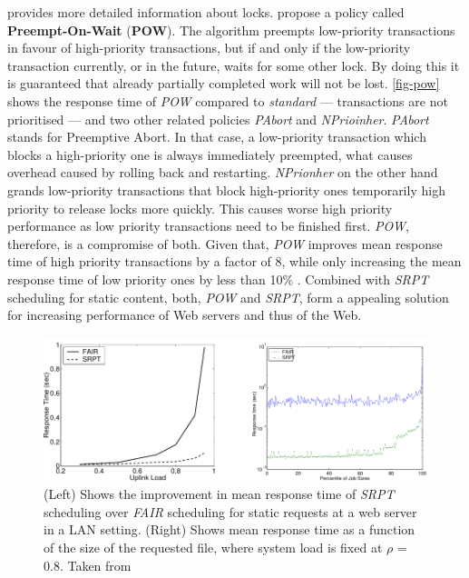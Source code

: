 \documentclass[
  a4paper,               %
  twoside,               %
  headings=small,        %
  DIV=12,                %
  BCOR=1cm,              %
  headinclude=true,      %
  footinclude=true,      %
  numbers=noenddot,      %
  11pt]{scrartcl}        %
\begin{document}
\cite{Callison09} provides more detailed information about locks. \cite{McWherter} propose a policy called \textbf{Preempt-On-Wait} (\textbf{POW}). The algorithm preempts low-priority transactions in favour of high-priority transactions, but if and only if the low-priority transaction currently, or in the future, waits for some other lock. By doing this it is guaranteed that already partially completed work will not be lost. \autoref{fig-pow} shows the response time of \textit{POW} compared to \textit{standard} --- transactions are not prioritised --- and two other related policies \textit{PAbort} and \textit{NPrioinher}. \textit{PAbort} stands for Preemptive Abort. In that case, a low-priority transaction which blocks a high-priority one is always immediately preempted, what causes overhead caused by rolling back and restarting. \textit{NPrionher} on the other hand grands low-priority transactions that block high-priority ones temporarily high priority to release locks more quickly. This causes worse high priority performance as low priority transactions need to be finished first. \textit{POW}, therefore, is a compromise of both. Given that, \textit{POW} improves mean response time of high priority transactions by a factor of 8, while only increasing the mean response time of low priority ones by less than 10\% \cite{schorederSchedule}. Combined with \textit{SRPT} scheduling for static content, both, \textit{POW} and \textit{SRPT}, form a appealing solution for increasing performance of Web servers and thus of the Web. 




\begin{figure}[h]
\centerline{\includegraphics[width=15cm]{pics/srpt.pdf}}
\caption{(Left) Shows the improvement in mean response time of \textit{SRPT} scheduling over \textit{FAIR} scheduling for static requests at a web
server in a LAN setting. (Right) Shows mean response time as a function of the size of the requested file, where system load is fixed at
$\rho$ = 0.8. Taken from \cite{schorederSchedule}}
\label{fig-srpt}
\end{figure}
\end{document}
